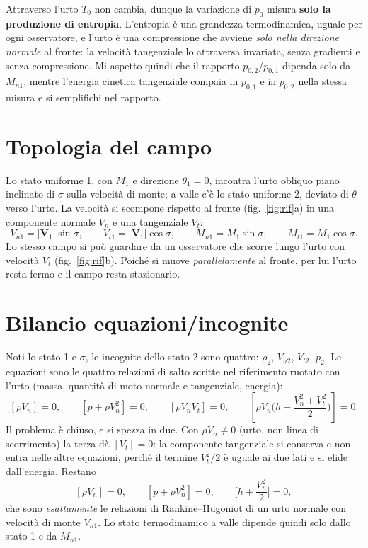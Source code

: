 \documentclass[11pt,a4paper]{article}
\newcommand{\Vv}{\boldsymbol V}
\newcommand{\Mn}{M_{n1}}
\begin{document}
Attraverso l'urto $T_0$ non cambia, dunque la variazione di $p_0$ misura \textbf{solo la produzione di entropia}.
L'entropia è una grandezza termodinamica, uguale per ogni osservatore, e l'urto è una compressione che avviene
\emph{solo nella direzione normale} al fronte: la velocità tangenziale lo attraversa invariata, senza gradienti e
senza compressione. Mi aspetto quindi che il rapporto $p_{0,2}/p_{0,1}$ dipenda solo da $\Mn$, mentre l'energia
cinetica tangenziale compaia in $p_{0,1}$ e in $p_{0,2}$ nella stessa misura e si semplifichi nel rapporto.

\section{Topologia del campo}
Lo stato uniforme 1, con $M_1$ e direzione $\theta_1=0$, incontra l'urto obliquo piano inclinato di $\sigma$
sulla velocità di monte; a valle c'è lo stato uniforme 2, deviato di $\theta$ verso l'urto. La velocità si
scompone rispetto al fronte (fig.~\ref{fig:rif}a) in una componente normale $V_n$ e una tangenziale $V_t$:
\[
  V_{n1}=|\Vv_1|\sin\sigma,\qquad V_{t1}=|\Vv_1|\cos\sigma,\qquad
  \Mn=M_1\sin\sigma,\qquad M_{t1}=M_1\cos\sigma .
\]
Lo stesso campo si può guardare da un osservatore che scorre lungo l'urto con velocità $V_t$
(fig.~\ref{fig:rif}b). Poiché si muove \emph{parallelamente} al fronte, per lui l'urto resta fermo e il campo
resta stazionario.

\section{Bilancio equazioni/incognite}
Noti lo stato 1 e $\sigma$, le incognite dello stato 2 sono quattro: $\rho_2$, $V_{n2}$, $V_{t2}$, $p_2$. Le
equazioni sono le quattro relazioni di salto scritte nel riferimento ruotato con l'urto (massa, quantità di moto
normale e tangenziale, energia):
\[
  [\rho V_n]=0,\qquad [p+\rho V_n^2]=0,\qquad [\rho V_n V_t]=0,\qquad
  \left[\rho V_n\Big(h+\frac{V_n^2+V_t^2}{2}\Big)\right]=0 .
\]
Il problema è chiuso, e si spezza in due. Con $\rho V_n\neq0$ (urto, non linea di scorrimento) la terza dà
$[V_t]=0$: la componente tangenziale si conserva e non entra nelle altre equazioni, perché il termine
$V_t^2/2$ è uguale ai due lati e si elide dall'energia. Restano
\[
  [\rho V_n]=0,\qquad [p+\rho V_n^2]=0,\qquad \Big[h+\frac{V_n^2}{2}\Big]=0,
\]
che sono \emph{esattamente} le relazioni di Rankine--Hugoniot di un urto normale con velocità di monte $V_{n1}$.
Lo stato termodinamico a valle dipende quindi solo dallo stato 1 e da $\Mn$.
\end{document}
